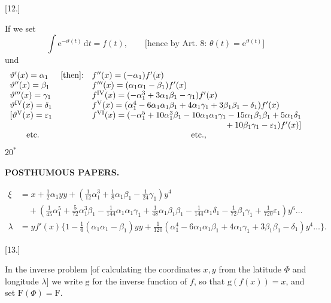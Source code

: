 \begin{center}[12.]\end{center}
If we set
\[
\int\mathrm e^{-\vartheta(t)}\,\mathrm dt=f(t),\qquad
\text{[hence by Art.\ 8: }\theta(t)=\mathrm e^{\vartheta(t)}\text{]}
\]
\noindent und
\[
\begin{array}{l@{\quad}l@{\quad}l}
\vartheta'(x)=\alpha_1&\text{[then]:}&f''(x)=(-\alpha_1)f'(x)\\
\vartheta''(x)=\beta_1&&f'''(x)=(\alpha_1\alpha_1-\beta_1)f'(x)\\
\vartheta'''(x)=\gamma_1&&
 f^{\mathrm{IV}}(x)=(-\alpha_1^3+3\alpha_1\beta_1-\gamma_1)f'(x)\\
\vartheta^{\mathrm{IV}}(x)=\delta_1&&
 f^{\mathrm V}(x)=(\alpha_1^4-6\alpha_1\alpha_1\beta_1+4\alpha_1\gamma_1
 +3\beta_1\beta_1-\delta_1)f'(x)\\
\mathopen{[}\vartheta^{\mathrm V}(x)=\varepsilon_1&&
 f^{\mathrm{VI}}(x)=(-\alpha_1^5+10\alpha_1^3\beta_1-10\alpha_1\alpha_1\gamma_1
 -15\alpha_1\beta_1\beta_1+5\alpha_1\delta_1\\
&&\multicolumn{1}{r}{{}+10\beta_1\gamma_1-\varepsilon_1)f'(x)]}\\
\qquad\text{etc.}&&\multicolumn{1}{c}{\text{etc.,}}
\end{array}
\]
\noindent\hfill \(20^{*}\)\hspace*{.17\linewidth}\par
\par\clearpage
\noindent{}\hfill{\small\textbf{POSTHUMOUS PAPERS.}}\hfill\null\par\medskip

\[
\begin{aligned}
\xi&=x+\tfrac12\alpha_1yy+
  (\tfrac1{12}\alpha_1^3+\tfrac18\alpha_1\beta_1-\tfrac1{24}\gamma_1)y^4\\
 &\quad+(\tfrac1{45}\alpha_1^5+\tfrac5{72}\alpha_1^3\beta_1
 -\tfrac1{144}\alpha_1\alpha_1\gamma_1+\tfrac1{48}\alpha_1\beta_1\beta_1
 -\tfrac1{144}\alpha_1\delta_1-\tfrac1{72}\beta_1\gamma_1
 +\tfrac1{720}\varepsilon_1)y^6\ldots\\
\lambda&=yf'(x)\{1-\tfrac16(\alpha_1\alpha_1-\beta_1)yy+
  \tfrac1{120}(\alpha_1^4-6\alpha_1\alpha_1\beta_1+4\alpha_1\gamma_1
  +3\beta_1\beta_1-\delta_1)y^4\ldots\}.
\end{aligned}
\]

\begin{center}
[13.]\par{}
\end{center}
In the inverse problem [of calculating the coordinates \(x,y\) from the latitude \(\Phi\) and
longitude \(\lambda\)] we write \(\mathrm g\) for the inverse function of
\(f\), so that \(\mathrm g(f(x))=x\), and set \(\mathrm F(\Phi)=\mathrm F\).

